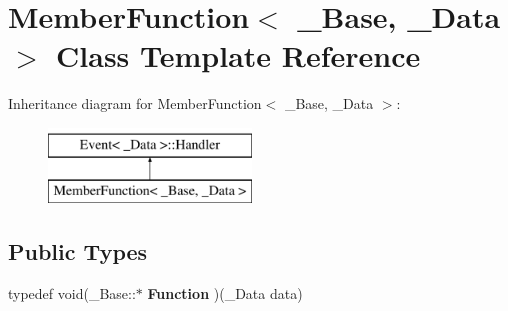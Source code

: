 \hypertarget{class_member_function}{
\section{MemberFunction$<$ \_\-Base, \_\-Data $>$ Class Template Reference}
\label{class_member_function}
}
Inheritance diagram for MemberFunction$<$ \_\-Base, \_\-Data $>$:\begin{figure}[H]
\begin{center}
\leavevmode
\includegraphics[height=2cm]{class_member_function}
\end{center}
\end{figure}
\subsection*{Public Types}
\begin{DoxyCompactItemize}
\item 
\hypertarget{class_member_function_a11d75f2ad61047f8d17743895e4fcbac}{
typedef void(\_\-Base::$\ast$ {\bfseries Function} )(\_\-Data data)}
\label{class_member_function_a11d75f2ad61047f8d17743895e4fcbac}

\end{DoxyCompactItemize}
